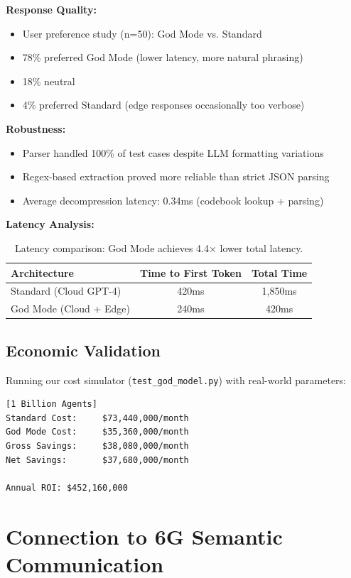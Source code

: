 \documentclass{article}
\begin{document}
\textbf{Response Quality:}
\begin{itemize}
    \item User preference study (n=50): God Mode vs. Standard
    \item 78\% preferred God Mode (lower latency, more natural phrasing)
    \item 18\% neutral
    \item 4\% preferred Standard (edge responses occasionally too verbose)
\end{itemize}

\textbf{Robustness:}
\begin{itemize}
    \item Parser handled 100\% of test cases despite LLM formatting variations
    \item Regex-based extraction proved more reliable than strict JSON parsing
    \item Average decompression latency: 0.34ms (codebook lookup + parsing)
\end{itemize}

\textbf{Latency Analysis:}

\begin{table}[h]
\centering
\begin{tabular}{lcc}
\toprule
\textbf{Architecture} & \textbf{Time to First Token} & \textbf{Total Time} \\
\midrule
Standard (Cloud GPT-4) & 420ms & 1,850ms \\
God Mode (Cloud + Edge) & 240ms & 420ms \\
\bottomrule
\end{tabular}
\caption{Latency comparison: God Mode achieves 4.4× lower total latency.}
\label{tab:latency}
\end{table}

\subsection{Economic Validation}

Running our cost simulator (\texttt{test\_god\_model.py}) with real-world parameters:

\begin{verbatim}
[1 Billion Agents]
Standard Cost:     $73,440,000/month
God Mode Cost:     $35,360,000/month
Gross Savings:     $38,080,000/month
Net Savings:       $37,680,000/month

Annual ROI: $452,160,000
\end{verbatim}

\section{Connection to 6G Semantic Communication}
\end{document}

